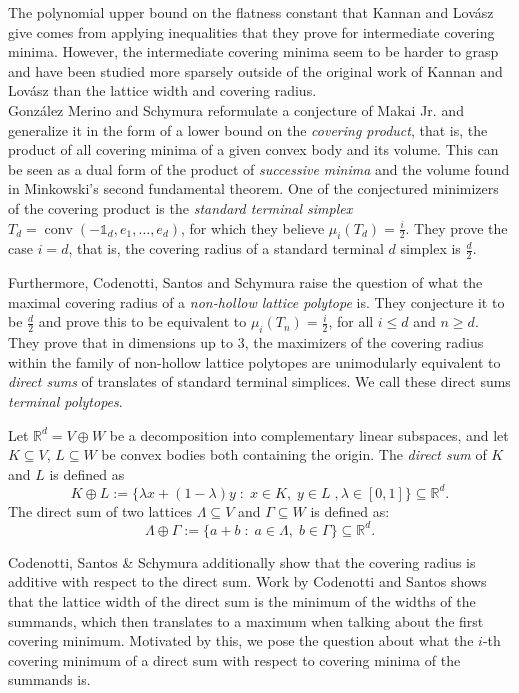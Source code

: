 \documentclass{amsart}
\theoremstyle{definition}
\theoremstyle{remark}
\newcommand{\R}{\mathbb{R}}
\begin{document}
The polynomial upper bound on the flatness constant that Kannan and Lov\' asz give comes from applying inequalities that they prove for intermediate covering minima. However, the intermediate covering minima seem to be harder to grasp and have been studied more sparsely outside of the original work of Kannan and Lov\' asz than the lattice width and covering radius.\\




Gonz\' alez Merino and Schymura \cite{MerinoSchymura} reformulate a conjecture of Makai Jr. \cite{MakaiJr} and generalize it in the form of a lower bound on the \textit{covering product}, that is, the product of all covering minima of a given convex body and its volume. This can be seen as a dual form of the product of \textit{successive minima} and the volume found in Minkowski's second fundamental theorem. One of the conjectured minimizers of the covering product is the \textit{standard terminal simplex} $T_d=\operatorname{conv}(-\mathbb{1}_d, e_1,\dots, e_d)$, for which they believe $\mu_i(T_d)=\frac{i}{2}$. They prove the case $i=d$, that is, the covering radius of a standard terminal $d$ simplex is $\frac{d}{2}$.
 
Furthermore, Codenotti, Santos and Schymura \cite{CodenottiSantosSchymura} raise the question of what the maximal covering radius of a \textit{non-hollow lattice polytope} is. They conjecture it to be $\frac{d}{2}$ and prove this to be equivalent to $\mu_i(T_n)=\frac{i}{2}$, for all $i\leqslant d$ and $n\geqslant d$. They  prove that in dimensions up to $3$, the maximizers of the covering radius within the family of non-hollow lattice polytopes are unimodularly equivalent to \textit{direct sums} of translates of standard terminal simplices. We call these direct sums \textit{terminal polytopes}. 


Let $\R^d=V\oplus W$ be a decomposition into complementary linear subspaces, and let $K\subseteq V$, $L\subseteq W$ be convex bodies both containing the origin. The \textit{direct sum} of $K$ and $L$ is defined as 
$$K\oplus L := \{ \lambda x +(1-\lambda)y\;:\; x\in K,\; y\in L\;, \lambda\in[0,1]\}\subseteq \R^d.$$
The direct sum of two lattices $\Lambda\subseteq V$ and $\Gamma \subseteq W$ is defined as:
$$\Lambda\oplus\Gamma:=\{a+b\;:\; a\in \Lambda,\;b\in\Gamma\}\subseteq \R^d.$$




Codenotti, Santos \& Schymura \cite{CodenottiSantosSchymura} additionally show that the covering radius is additive with respect to the direct sum. Work by Codenotti and Santos \cite{CodenottiSantos} shows that the lattice width of the direct sum is the minimum of the widths of the summands, which then translates to a maximum when talking about the first covering minimum. Motivated by this, we pose the question about what the $i$-th covering minimum of a direct sum with respect to covering minima of the summands is.
\end{document}

